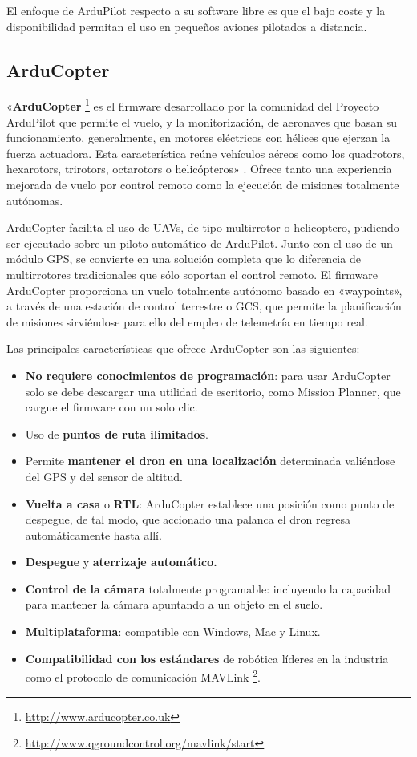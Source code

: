 El enfoque de ArduPilot respecto a su software libre es que el bajo coste y la disponibilidad permitan el uso en pequeños aviones 
pilotados a distancia.

\subsection{ArduCopter}
\label{sec:arducopter}

«\textbf{ArduCopter} \footnote{\url{http://www.arducopter.co.uk}} es el firmware desarrollado por la comunidad del Proyecto ArduPilot que permite el vuelo, y la monitorización, de aeronaves que basan su funcionamiento, generalmente, en motores eléctricos con hélices  que  ejerzan  la  fuerza  actuadora.  Esta característica  reúne  vehículos  aéreos  como  los  quadrotors, hexarotors, trirotors, octarotors o helicópteros» \cite{arducopter}. Ofrece tanto una experiencia mejorada de vuelo por control remoto como la ejecución de misiones totalmente autónomas.

ArduCopter facilita el uso de \acs{UAV}s, de tipo multirrotor o helicoptero, pudiendo ser ejecutado sobre un piloto automático de ArduPilot.
Junto con el uso de un módulo \acs{GPS}, se convierte en una solución completa que lo diferencia de multirrotores tradicionales que sólo 
soportan el control remoto. El firmware ArduCopter proporciona un vuelo totalmente autónomo basado en «waypoints», a través de 
una estación de control terrestre o \acs{GCS}, que permite la planificación de misiones sirviéndose para ello del empleo de telemetría en tiempo real.

Las principales características que ofrece ArduCopter son las siguientes:
\begin{itemize}
\item \textbf{No requiere conocimientos de programación}: para usar ArduCopter solo se debe descargar una utilidad de escritorio, como 
Mission Planner, que cargue el firmware con un solo clic.
\item Uso de \textbf{puntos de ruta ilimitados}.
\item Permite \textbf{mantener el dron en una localización} determinada valiéndose del \acs{GPS} y del sensor de altitud.
\item \textbf{Vuelta a casa} o \textbf{\acs{RTL}}: ArduCopter establece una posición como punto de despegue, de tal modo, que accionado una palanca el dron regresa automáticamente hasta allí.
\item \textbf{Despegue} y \textbf{aterrizaje automático.}
\item \textbf{Control de la cámara} totalmente programable: incluyendo la capacidad para mantener la cámara apuntando a un objeto en el suelo.
\item \textbf{Multiplataforma}: compatible con Windows, Mac y Linux.
\item \textbf{Compatibilidad con los estándares} de robótica líderes en la industria como el protocolo de comunicación MAVLink \footnote{\url{http://www.qgroundcontrol.org/mavlink/start}}.
\end{itemize}


